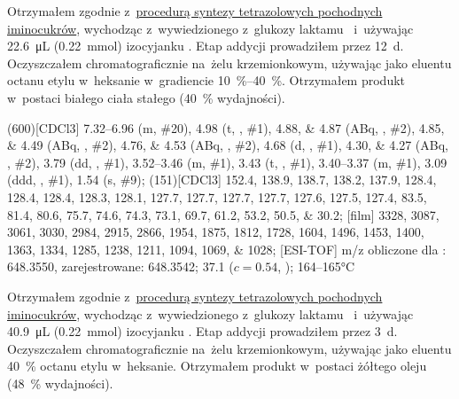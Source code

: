 Otrzymałem zgodnie z~\hyperref[experimental:sugars:schwartz]{procedurą syntezy tetrazolowych
  pochodnych iminocukrów}, wychodząc z~wywiedzionego z~glukozy laktamu~
  i~używając \SI{22.6}{\micro\liter} (\SI{0.22}{\milli\mol}) izocyjanku .
Etap addycji prowadziłem przez \SI{12}{\day}.
Oczyszczałem chromatograficznie na~żelu krzemionkowym,
  używając jako eluentu octanu etylu w~heksanie w~gradiencie \SIrange{10}{40}{\percent}.
Otrzymałem produkt w~postaci białego ciała stałego (\SI{40}{\percent} wydajności).

\begin{fullexp}
  \NMR(600)[CDCl3] \numrange{7.32}{6.96} (m, \#{20}), \num{4.98} (t, , \#{1}), \numlist{4.88;4.87} (ABq, , \#{2}), \numlist{4.85;4.49} (ABq, , \#{2}), \numlist{4.76;4.53} (ABq, , \#{2}), \num{4.68} (d, , \#{1}), \numlist{4.30;4.27} (ABq, , \#{2}), \num{3.79} (dd, , \#{1}), \numrange{3.52}{3.46} (m, \#{1}), \num{3.43} (t, , \#{1}), \numrange{3.40}{3.37} (m, \#{1}), \num{3.09} (ddd, , \#{1}), \num{1.54} (s, \#{9});
  (151)[CDCl3] \numlist{152.4; 138.9; 138.7; 138.2; 137.9; 128.4; 128.4; 128.4; 128.3; 128.1; 127.7; 127.7; 127.7; 127.7; 127.6; 127.5; 127.4; 83.5; 81.4; 80.6; 75.7; 74.6; 74.3; 73.1; 69.7; 61.2; 53.2; 50.5; 30.2};
  [film] \numlist{3328; 3087; 3061; 3030; 2984; 2915; 2866; 1954; 1875; 1812; 1728; 1604; 1496; 1453; 1400; 1363; 1334; 1285; 1238; 1211; 1094; 1069; 1028};
  [ESI-TOF] m/z obliczone dla : \num{648.3550}, zarejestrowane: \num{648.3542};
  \data{[$\alpha^{23}_D$]~$=$} \num{37.1} ($c = 0.54$, );
   \numrange{164}{165}\si{\celsius}
\end{fullexp}

Otrzymałem zgodnie z~\hyperref[experimental:sugars:schwartz]{procedurą syntezy tetrazolowych
  pochodnych iminocukrów}, wychodząc z~wywiedzionego z~glukozy laktamu~
  i~używając \SI{40.9}{\micro\liter} (\SI{0.22}{\milli\mol}) izocyjanku .
Etap addycji prowadziłem przez \SI{3}{\day}.
Oczyszczałem chromatograficznie na~żelu krzemionkowym,
  używając jako eluentu \SI{40}{\percent} octanu etylu w~heksanie.
Otrzymałem produkt w~postaci żółtego oleju (\SI{48}{\percent} wydajności).

